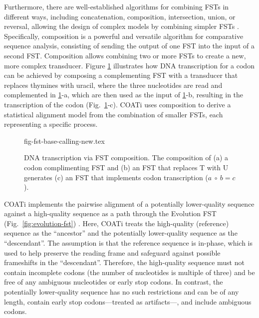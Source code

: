 Furthermore, there are well-established algorithms for combining FSTs in different ways, including concatenation, composition, intersection, union, or reversal, allowing the design of complex models by combining simpler FSTs \citep{bradley2007transducers,silvestre2021machine}.
Specifically, composition is a powerful and versatile algorithm for comparative sequence analysis, consisting of sending the output of one FST into the input of a second FST.
Composition allows combining two or more FSTs to create a new, more complex transducer. Figure \ref{fig:transcription} illustrates how DNA transcription for a codon can be achieved by composing a complementing FST with a transducer that replaces thymines with uracil, where the three nucleotides are read and complemented in \ref{fig:transcription}-a, which are then used as the input of \ref{fig:transcription}-b, resulting in the transcription of the codon (Fig.~\ref{fig:transcription}-c). COATi uses composition to derive a statistical alignment model from the combination of smaller FSTs, each representing a specific process.

\begin{figure}[!ht]
    \centering
    {fig-fst-base-calling-new.tex}
    \caption[DNA Transcription via FST Composition]{DNA transcription via FST composition. The composition of (a) a codon complimenting FST and (b) an FST that replaces T with U generates (c) an FST that implements codon transcription ($a~\circ~b = c$).}
    \label{fig:transcription}
\end{figure}

COATi implements the pairwise alignment of a potentially lower-quality sequence against a high-quality sequence as a path through the Evolution FST (Fig.\ \ref{fig:evolution-fst}) \citep[c.f.][]{holmes2001evolutionary}.
Here, COATi treats the high-quality (reference) sequence as the ``ancestor'' and the potentially lower-quality sequence as the ``descendant''.
The assumption is that the reference sequence is in-phase, which is used to help preserve the reading frame and safeguard against possible frameshifts in the ``descendant''. Therefore, the high-quality sequence must not contain incomplete codons (the number of nucleotides is multiple of three) and be free of any ambiguous nucleotides or early stop codons. In contrast, the potentially lower-quality sequence has no such restrictions and can be of any length, contain early stop codons---treated as artifacts---, and include ambiguous codons.

